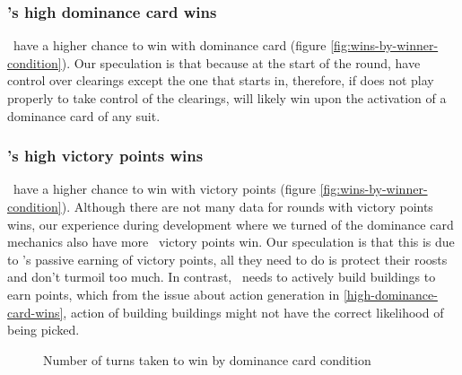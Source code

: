 \subsubsection{\Marquise's high dominance card wins}
\Marquise \ have a higher chance to win with dominance card (figure \ref{fig:wins-by-winner-condition}). Our speculation is that because at the start of the round, \Marquise{} have control over clearings except the one that \Eyrie{} starts in, therefore, if \Eyrie{} does not play properly to take control of the clearings, \Marquise{} will likely win upon the activation of a dominance card of any suit.

\subsubsection{\Eyrie's high victory points wins}
\Eyrie \ have a higher chance to win with victory points (figure \ref{fig:wins-by-winner-condition}). Although there are not many data for rounds with victory points wins, our experience during development where we turned of the dominance card mechanics also have more \Eyrie \ victory points win. Our speculation is that this is due to \Eyrie's passive earning of victory points, all they need to do is protect their roosts and don't turmoil too much. In contrast, \Marquise \ needs to actively build buildings to earn points, which from the issue about action generation in \ref{high-dominance-card-wins}, action of building buildings might not have the correct likelihood of being picked.



\begin{figure}
    \centering
    \caption{Number of turns taken to win by dominance card condition}
\end{figure}

